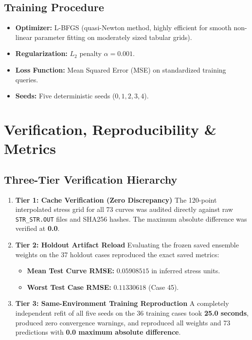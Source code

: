 \documentclass[11pt,a4paper]{article}
\begin{document}
\subsection{Training Procedure}
\begin{itemize}
    \item \textbf{Optimizer:} L-BFGS (quasi-Newton method, highly efficient for smooth non-linear parameter fitting on moderately sized tabular grids).
    \item \textbf{Regularization:} $L_2$ penalty $\alpha = 0.001$.
    \item \textbf{Loss Function:} Mean Squared Error (MSE) on standardized training queries.
    \item \textbf{Seeds:} Five deterministic seeds ($0, 1, 2, 3, 4$).
\end{itemize}

\section{Verification, Reproducibility \& Metrics}

\subsection{Three-Tier Verification Hierarchy}
\begin{enumerate}
    \item \textbf{Tier 1: Cache Verification (Zero Discrepancy)}
    The 120-point interpolated stress grid for all 73 curves was audited directly against raw \texttt{STR\_STR.OUT} files and SHA256 hashes. The maximum absolute difference was verified at \textbf{0.0}.
    
    \item \textbf{Tier 2: Holdout Artifact Reload}
    Evaluating the frozen saved ensemble weights on the 37 holdout cases reproduced the exact saved metrics:
    \begin{itemize}
        \item \textbf{Mean Test Curve RMSE:} $\mathbf{0.05908515}$ in inferred stress units.
        \item \textbf{Worst Test Case RMSE:} $\mathbf{0.11330618}$ (Case 45).
    \end{itemize}

    \item \textbf{Tier 3: Same-Environment Training Reproduction}
    A completely independent refit of all five seeds on the 36 training cases took \textbf{25.0 seconds}, produced zero convergence warnings, and reproduced all weights and 73 predictions with \textbf{0.0 maximum absolute difference}.
\end{enumerate}
\end{document}
